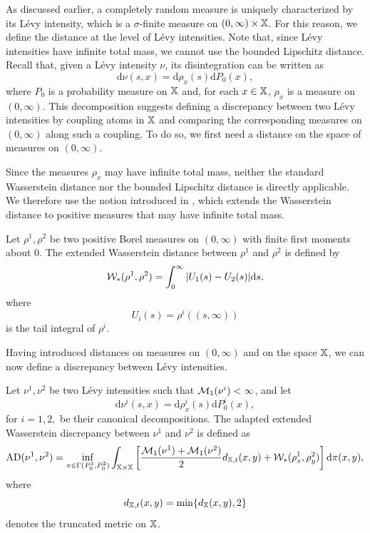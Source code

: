 As discussed earlier, a completely random measure is uniquely characterized by its L\'evy intensity, which is a $\sigma$-finite measure on $(0,\infty)\times \mathbb{X}$. For this reason, we define the distance at the level of L\'evy intensities. Note that, since L\'evy intensities have infinite total mass, we cannot use the bounded Lipschitz distance. Recall that, given a L\'evy intensity $\nu$, its disintegration can be written as
\[
\mathrm{d}\nu(s,x) = \mathrm{d}\rho_x(s)\mathrm{d}P_0(x),
\]
where $P_0$ is a probability measure on $\mathbb{X}$ and, for each $x \in \mathbb{X}$, $\rho_x$ is a measure on $(0,\infty)$. This decomposition suggests defining a discrepancy between two L\'evy intensities by coupling atoms in $\mathbb{X}$ and comparing the corresponding measures on $(0,\infty)$ along such a coupling. To do so, we first need a distance on the space of measures on $(0,\infty)$.

Since the measures $\rho_x$ may have infinite total mass, neither the standard Wasserstein distance nor the bounded Lipschitz distance is directly applicable. We therefore use the notion introduced in \cite{figalli2010new}, which extends the Wasserstein distance to positive measures that may have infinite total mass.

\begin{definition}\label{definition:extended_wasserstein}
Let $\rho^1, \rho^2$ be two positive Borel measures on $(0,\infty)$ with finite first moments about $0$. The extended Wasserstein distance between $\rho^1$ and $\rho^2$ is defined by
\[
\mathcal{W}_*(\rho^1, \rho^2) = \int_0^\infty |U_1(s)-U_2(s)|\mathrm{d}s,
\]
where
\[
U_i(s) = \rho^i((s,\infty))
\]
is the tail integral of $\rho^i$.
\end{definition}

Having introduced distances on measures on $(0,\infty)$ and on the space $\mathbb{X}$, we can now define a discrepancy between L\'evy intensities.

\begin{definition}\label{definition:adapted_extended_wasserstein}
Let $\nu^1, \nu^2$ be two L\'evy intensities such that $\mathcal{M}_1(\nu^i)<\infty$, and let
\[
\mathrm{d}\nu^i(s,x) = \mathrm{d}\rho_x^i(s)\mathrm{d}P_0^i(x),
\]
for $i=1,2,$ be their canonical decompositions. The adapted extended Wasserstein discrepancy between $\nu^1$ and $\nu^2$ is defined as
\[
\mathrm{AD}(\nu^1,\nu^2)=\inf_{\pi \in \Gamma(P_0^1,P_0^2)} \int_{\mathbb{X}\times\mathbb{X}} \left[ \frac{\mathcal{M}_1(\nu^1)+\mathcal{M}_1(\nu^2)}{2} d_{\mathbb{X},t}(x,y) + \mathcal{W}_*(\rho_x^1,\rho_y^2)\right] \mathrm{d}\pi(x,y),
\]
where
\[
d_{\mathbb{X},t}(x,y)=\min\{d_{\mathbb{X}}(x,y),2\}
\]
denotes the truncated metric on $\mathbb{X}$.
\end{definition}

